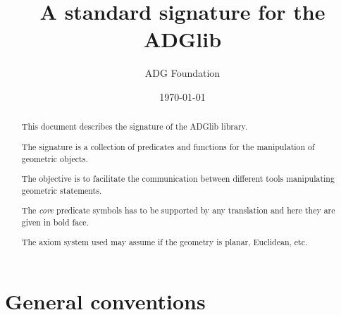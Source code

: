 \documentclass[a4wide,9pt,landscape]{article}
\title{A standard signature for the ADGlib}
\author{ADG Foundation}
\date{\today}
\begin{document}
\maketitle

\begin{abstract}
  This document describes the signature of the ADGlib library.
  
  The signature is a collection of predicates and functions for the
  manipulation of geometric objects.
  
  The objective is to facilitate the communication between different
  tools manipulating geometric statements. 

  The {\em core} predicate symbols has to be supported by any
  translation and here they are given in bold face.

  The axiom system used may assume if the geometry is planar,
  Euclidean, etc.
  
\end{abstract}




\section{General conventions}


\newpage


\pagestyle{empty}
\end{document}
